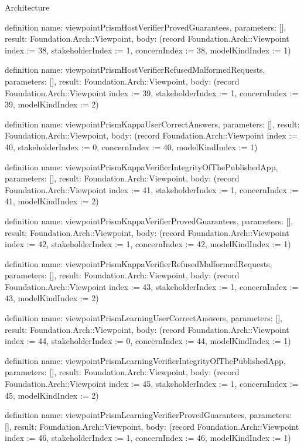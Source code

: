 \begin{lexlean}{Architecture}
\begin{semanticmodule}
definition{
  name: viewpointPrismHostVerifierProvedGuarantees,
  parameters: [],
  result: Foundation.Arch::Viewpoint,
  body: (record Foundation.Arch::Viewpoint {index := 38, stakeholderIndex := 1, concernIndex := 38, modelKindIndex := 1})
}

definition{
  name: viewpointPrismHostVerifierRefusedMalformedRequests,
  parameters: [],
  result: Foundation.Arch::Viewpoint,
  body: (record Foundation.Arch::Viewpoint {index := 39, stakeholderIndex := 1, concernIndex := 39, modelKindIndex := 2})
}

definition{
  name: viewpointPrismKappaUserCorrectAnswers,
  parameters: [],
  result: Foundation.Arch::Viewpoint,
  body: (record Foundation.Arch::Viewpoint {index := 40, stakeholderIndex := 0, concernIndex := 40, modelKindIndex := 1})
}

definition{
  name: viewpointPrismKappaVerifierIntegrityOfThePublishedApp,
  parameters: [],
  result: Foundation.Arch::Viewpoint,
  body: (record Foundation.Arch::Viewpoint {index := 41, stakeholderIndex := 1, concernIndex := 41, modelKindIndex := 2})
}

definition{
  name: viewpointPrismKappaVerifierProvedGuarantees,
  parameters: [],
  result: Foundation.Arch::Viewpoint,
  body: (record Foundation.Arch::Viewpoint {index := 42, stakeholderIndex := 1, concernIndex := 42, modelKindIndex := 1})
}

definition{
  name: viewpointPrismKappaVerifierRefusedMalformedRequests,
  parameters: [],
  result: Foundation.Arch::Viewpoint,
  body: (record Foundation.Arch::Viewpoint {index := 43, stakeholderIndex := 1, concernIndex := 43, modelKindIndex := 2})
}

definition{
  name: viewpointPrismLearningUserCorrectAnswers,
  parameters: [],
  result: Foundation.Arch::Viewpoint,
  body: (record Foundation.Arch::Viewpoint {index := 44, stakeholderIndex := 0, concernIndex := 44, modelKindIndex := 1})
}

definition{
  name: viewpointPrismLearningVerifierIntegrityOfThePublishedApp,
  parameters: [],
  result: Foundation.Arch::Viewpoint,
  body: (record Foundation.Arch::Viewpoint {index := 45, stakeholderIndex := 1, concernIndex := 45, modelKindIndex := 2})
}

definition{
  name: viewpointPrismLearningVerifierProvedGuarantees,
  parameters: [],
  result: Foundation.Arch::Viewpoint,
  body: (record Foundation.Arch::Viewpoint {index := 46, stakeholderIndex := 1, concernIndex := 46, modelKindIndex := 1})
}


\end{semanticmodule}
\end{lexlean}
